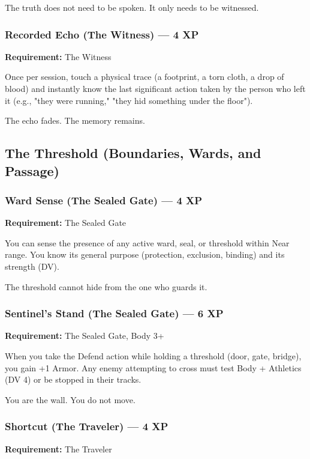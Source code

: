 The truth does not need to be spoken. It only needs to be witnessed.

\subsubsection{Recorded Echo (The Witness) — 4 XP}

\textbf{Requirement:} The Witness

Once per session, touch a physical trace (a footprint, a torn cloth, a drop of blood) and instantly know the last significant action taken by the person who left it (e.g., "they were running," "they hid something under the floor").

The echo fades. The memory remains.

\subsection{The Threshold (Boundaries, Wards, and Passage)}

\subsubsection{Ward Sense (The Sealed Gate) — 4 XP}

\textbf{Requirement:} The Sealed Gate

You can sense the presence of any active ward, seal, or threshold within Near range. You know its general purpose (protection, exclusion, binding) and its strength (DV).

The threshold cannot hide from the one who guards it.

\subsubsection{Sentinel's Stand (The Sealed Gate) — 6 XP}

\textbf{Requirement:} The Sealed Gate, Body 3+

When you take the Defend action while holding a threshold (door, gate, bridge), you gain +1 Armor. Any enemy attempting to cross must test Body + Athletics (DV 4) or be stopped in their tracks.

You are the wall. You do not move.

\subsubsection{Shortcut (The Traveler) — 4 XP}

\textbf{Requirement:} The Traveler

